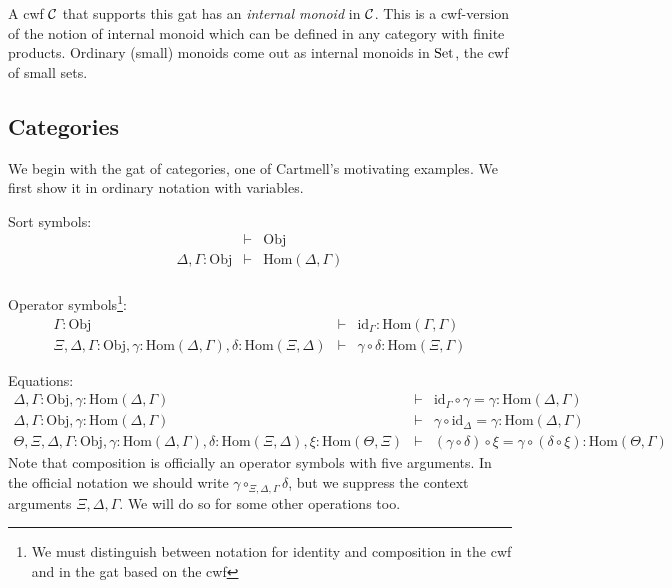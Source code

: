 \documentclass{lmcs}
\def\Obj{\mathrm{Obj}}
\def\Ctx{\mathrm{Ctx}}
\def\Hom{\mathrm{Hom}}
\def\id{\mathrm{id}}
\begin{document}
A cwf ${\mathcal C}$ that supports this gat has an {\em internal monoid} in ${\mathcal C}$. This is a cwf-version of the notion of internal monoid which can be defined in any category with finite products. Ordinary (small) monoids come out as internal monoids in ${\rm Set}$, the cwf of small sets.

\subsection{Categories} We begin with the gat of categories, one of Cartmell's motivating examples. We first show it in ordinary notation with variables.

Sort symbols:
\begin{eqnarray*}
&\vdash& \Obj\\
\Delta, \Gamma : \Obj &\vdash& \Hom(\Delta,\Gamma)\\
\end{eqnarray*}

Operator symbols\footnote{We must distinguish between notation for identity and composition in the cwf and in the gat based on the cwf}:
\begin{eqnarray*}
\Gamma : \Obj &\vdash& \id_\Gamma : \Hom(\Gamma,\Gamma)\\
\Xi,\Delta,\Gamma : \Obj, \gamma : \Hom(\Delta,\Gamma), \delta : \Hom(\Xi,\Delta) &\vdash&
\gamma \circ \delta : \Hom(\Xi,\Gamma)
\end{eqnarray*}

Equations:
\begin{eqnarray*}
\Delta, \Gamma : \Obj, \gamma : \Hom(\Delta,\Gamma) &\vdash& \id_\Gamma \circ \gamma = \gamma : \Hom(\Delta,\Gamma)\\
\Delta, \Gamma : \Obj, \gamma : \Hom(\Delta,\Gamma) &\vdash& \gamma \circ \id_\Delta = \gamma : \Hom(\Delta,\Gamma)\\
\Theta, \Xi,\Delta,\Gamma : \Obj, \gamma : \Hom(\Delta,\Gamma), \delta : \Hom(\Xi,\Delta), \xi : \Hom(\Theta,\Xi) &\vdash&
(\gamma \circ \delta) \circ \xi = \gamma \circ (\delta \circ \xi): \Hom(\Theta,\Gamma)
\end{eqnarray*}
Note that composition is officially an operator symbols with five arguments. In the official notation we should write $\gamma \circ_{\Xi,\Delta,\Gamma} \delta$, but we suppress the context arguments $\Xi,\Delta,\Gamma$. We will do so for some other operations too.
\end{document}
